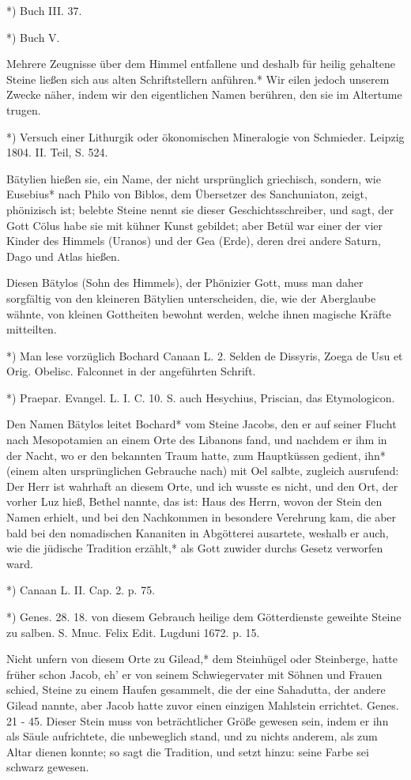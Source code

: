 \documentclass[a4paper, 11pt, oneside, polutonikogreek, german]{article}
\begin{document}
*) Buch III. 37.

*) Buch V.

Mehrere Zeugnisse über dem Himmel entfallene und deshalb für heilig gehaltene Steine ließen sich aus alten Schriftstellern anführen.* Wir eilen jedoch unserem Zwecke näher, indem wir den eigentlichen Namen berühren, den sie im Altertume trugen.

*) Versuch einer Lithurgik oder ökonomischen Mineralogie von Schmieder. Leipzig 1804. II. Teil, S. 524.

Bätylien hießen sie, ein Name, der nicht ursprünglich griechisch, sondern, wie Eusebius* nach Philo von Biblos, dem Übersetzer des Sanchuniaton, zeigt, phönizisch ist; belebte Steine nennt sie dieser Geschichtsschreiber, und sagt, der Gott Cölus habe sie mit kühner Kunst gebildet; aber Betül war einer der vier Kinder des Himmels (Uranos) und der Gea (Erde), deren drei andere Saturn, Dago und Atlas hießen.

Diesen Bätylos (Sohn des Himmels), der Phönizier Gott, muss man daher sorgfältig von den kleineren Bätylien unterscheiden, die, wie der Aberglaube wähnte, von kleinen Gottheiten bewohnt werden, welche ihnen magische Kräfte mitteilten.

*) Man lese vorzüglich Bochard Canaan L. 2. Selden de Dissyris, Zoega de Usu et Orig. Obelisc. Falconnet in der angeführten Schrift.

*) Praepar. Evangel. L. I. C. 10. S. auch Hesychius, Priscian, das Etymologicon.

Den Namen Bätylos leitet Bochard* vom Steine Jacobs, den er auf seiner Flucht nach Mesopotamien an einem Orte des Libanons fand, und nachdem er ihm in der Nacht, wo er den bekannten Traum hatte, zum Hauptküssen gedient, ihn* (einem alten ursprünglichen Gebrauche nach) mit Oel salbte, zugleich ausrufend: Der Herr ist wahrhaft an diesem Orte, und ich wusste es nicht, und den Ort, der vorher Luz hieß, Bethel nannte, das ist: Haus des Herrn, wovon der Stein den Namen erhielt, und bei den Nachkommen in besondere Verehrung kam, die aber bald bei den nomadischen Kananiten in Abgötterei ausartete, weshalb er auch, wie die jüdische Tradition erzählt,* als Gott zuwider durchs Gesetz verworfen ward.

*) Canaan L. II. Cap. 2. p. 75.

*) Genes. 28. 18. von diesem Gebrauch heilige dem Götterdienste geweihte Steine zu salben. S. Mnuc. Felix Edit. Lugduni 1672. p. 15.

Nicht unfern von diesem Orte zu Gilead,* dem Steinhügel oder Steinberge, hatte früher schon Jacob, eh' er von seinem Schwiegervater mit Söhnen und Frauen schied, Steine zu einem Haufen gesammelt, die der eine Sahadutta, der andere Gilead nannte, aber Jacob hatte zuvor einen einzigen Mahlstein errichtet. Genes. 21 - 45. Dieser Stein muss von beträchtlicher Größe gewesen sein, indem er ihn als Säule aufrichtete, die unbeweglich stand, und zu nichts anderem, als zum Altar dienen konnte; so sagt die Tradition, und setzt hinzu: seine Farbe sei schwarz gewesen.
\end{document}
